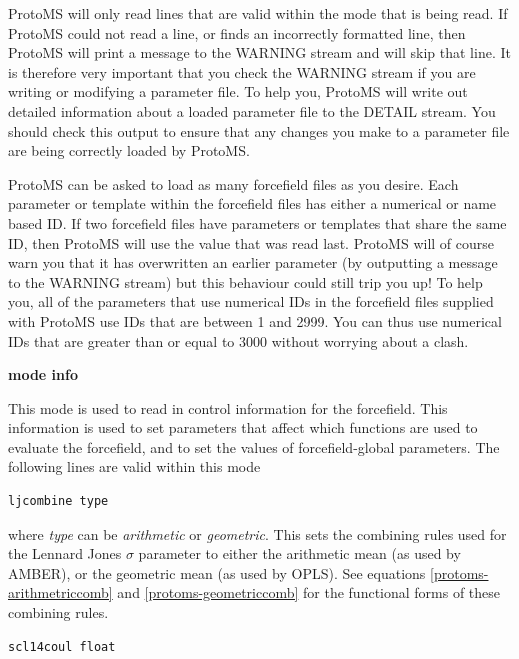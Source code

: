 \documentclass[letterpaper,10pt,english]{sphinxmanual}
\begin{document}
ProtoMS will only read lines that are valid within the mode that is being read. If ProtoMS could not read a line, or finds an incorrectly formatted line, then ProtoMS will print a message to the WARNING stream and will skip that line. It is therefore very important that you check the WARNING stream if you are writing or modifying a parameter file. To help you, ProtoMS will write out detailed information about a loaded parameter file to the DETAIL stream. You should check this output to ensure that any changes you make to a parameter file are being
correctly loaded by ProtoMS.

ProtoMS can be asked to load as many forcefield files as you desire. Each parameter or template within the forcefield files has either a numerical or name based ID. If two forcefield files have parameters or templates that share the same ID, then ProtoMS will use the value that was read last. ProtoMS will of course warn you that it has overwritten an earlier parameter (by outputting a message to the WARNING stream) but this behaviour could still trip you up! To help you, all of the parameters that use numerical IDs in the forcefield files supplied with ProtoMS use IDs that are between 1 and 2999. You can thus use numerical IDs that are greater than or equal to 3000 without worrying about a clash.

\textbf{mode info}

This mode is used to read in control information for the forcefield. This information is used to set parameters that affect which functions are used to evaluate the forcefield, and to set the values of forcefield-global parameters. The following lines are valid within this mode

\begin{Verbatim}[commandchars=\\\{\}]
ljcombine type
\end{Verbatim}

where \emph{type} can be \emph{arithmetic} or \emph{geometric}. This sets the combining rules used for the Lennard Jones \(\sigma\) parameter to either the arithmetic mean (as used by AMBER), or the geometric mean (as used by OPLS). See equations \eqref{protoms-arithmetriccomb} and \eqref{protoms-geometriccomb} for the functional forms of these combining rules.

\begin{Verbatim}[commandchars=\\\{\}]
scl14coul float
\end{Verbatim}
\end{document}
